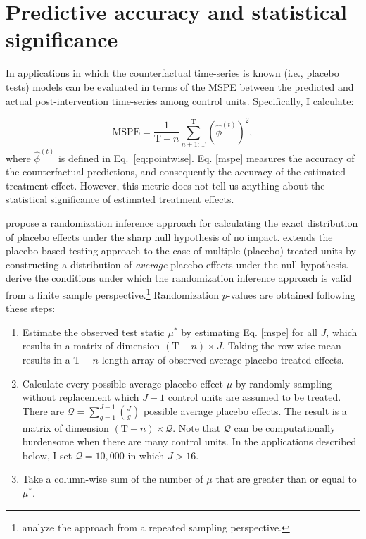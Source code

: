 \documentclass[hidelinks,12pt]{article}
\begin{document}
\section{Predictive accuracy and statistical significance} \label{eval}

In applications in which the counterfactual time-series is known (i.e., placebo tests) models can be evaluated in terms of the MSPE between the predicted and actual post-intervention time-series among control units. Specifically, I calculate:

\begin{equation}
	\text{MSPE} = \frac{1}{\text{T}-n} \sum_{n+1: \text{T}}^{\text{T}} \left(\hat{\phi}^{(t)} \right)^2, \label{mspe}
\end{equation} where $\hat{\phi}^{(t)}$ is defined in Eq.~\ref{eq:pointwise}. Eq. \ref{mspe} measures the accuracy of the counterfactual predictions, and consequently the accuracy of the estimated treatment effect. However, this metric does not tell us anything about the statistical significance of estimated treatment effects. 

\citet{abadie2010synthetic} propose a randomization inference approach for calculating the exact distribution of placebo effects under the sharp null hypothesis of no impact. \citet{cavallo2013catastrophic} extends the placebo-based testing approach to the case of multiple (placebo) treated units by constructing a distribution of \emph{average} placebo effects under the null hypothesis. \citet{firpo2018synthetic} derive the conditions under which the randomization inference approach is valid from a finite sample perspective.\footnote{\citet{hahn2017synthetic} analyze the approach from a repeated sampling perspective.} Randomization $p$-values are obtained following these steps:

\begin{enumerate} 
	\item Estimate the observed test static $\mu^{*}$ by estimating Eq. \ref{mspe} for all $J$, which results in a matrix of dimension $(\text{T}-n) \times J$. Taking the row-wise mean results in a $\text{T}-n$-length array of observed average placebo treated effects. 
	\item Calculate every possible average placebo effect $\mu$ by randomly sampling without replacement which $J-1$ control units are assumed to be treated. There are $\mathcal{Q} = \sum\limits_{g=1}^{J-1} {J \choose g}$ possible average placebo effects. The result is a matrix of dimension $(\text{T}-n) \times \mathcal{Q}$. Note that $\mathcal{Q}$ can be computationally burdensome when there are many control units. In the applications described below, I set $\mathcal{Q} = 10,000$ in which $J > 16$.
	\item Take a column-wise sum of the number of $\mu$ that are greater than or equal to $\mu^{*}$.  
\end{enumerate}
\end{document}
